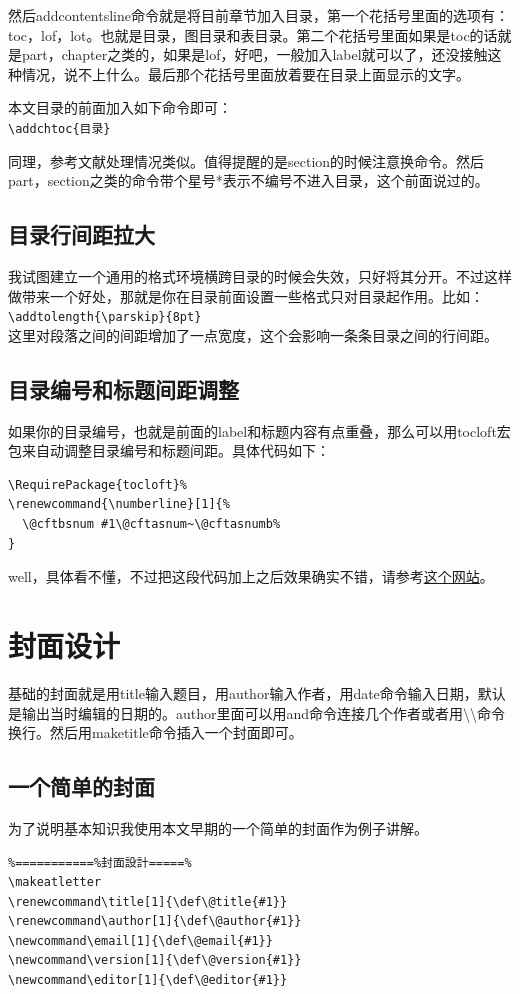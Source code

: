 \documentclass[12pt,oneside]{book}
\begin{document}
\begin{common-format}
然后addcontentsline命令就是将目前章节加入目录，第一个花括号里面的选项有：toc，lof，lot。也就是目录，图目录和表目录。第二个花括号里面如果是toc的话就是part，chapter之类的，如果是lof，好吧，一般加入label就可以了，还没接触这种情况，说不上什么。最后那个花括号里面放着要在目录上面显示的文字。

本文目录的前面加入如下命令即可：\\
\verb+\addchtoc{目录}+

同理，参考文献处理情况类似。值得提醒的是section的时候注意换命令。然后part，section之类的命令带个星号*表示不编号不进入目录，这个前面说过的。

\subsection{目录行间距拉大}
我试图建立一个通用的格式环境横跨目录的时候会失效，只好将其分开。不过这样做带来一个好处，那就是你在目录前面设置一些格式只对目录起作用。比如：\\
\verb+\addtolength{\parskip}{8pt}+\\
这里对段落之间的间距增加了一点宽度，这个会影响一条条目录之间的行间距。


\subsection{目录编号和标题间距调整}
如果你的目录编号，也就是前面的label和标题内容有点重叠，那么可以用tocloft宏包来自动调整目录编号和标题间距。具体代码如下：
\begin{Verbatim}
\RequirePackage{tocloft}%
\renewcommand{\numberline}[1]{%
  \@cftbsnum #1\@cftasnum~\@cftasnumb%
}
\end{Verbatim}

well，具体看不懂，不过把这段代码加上之后效果确实不错，请参考\href{http://tex.stackexchange.com/questions/64115/table-of-contents-chapter-number-width}{这个网站}。




\section{封面设计}
基础的封面就是用title输入题目，用author输入作者，用date命令输入日期，默认是输出当时编辑的日期的。author里面可以用and命令连接几个作者或者用\textbackslash \textbackslash 命令换行。然后用maketitle命令插入一个封面即可。


\subsection{一个简单的封面}
为了说明基本知识我使用本文早期的一个简单的封面作为例子讲解。
\begin{Verbatim}
%===========%封面設計=====%
\makeatletter
\renewcommand\title[1]{\def\@title{#1}}
\renewcommand\author[1]{\def\@author{#1}}
\newcommand\email[1]{\def\@email{#1}}
\newcommand\version[1]{\def\@version{#1}}
\newcommand\editor[1]{\def\@editor{#1}}


\end{Verbatim}
\end{common-format}
\end{document}
